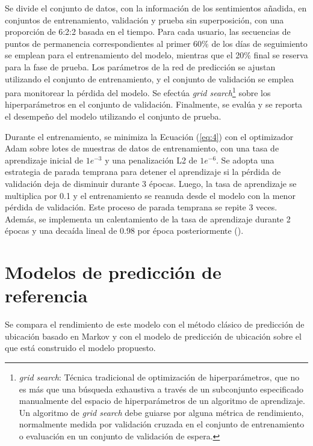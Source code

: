 Se divide el conjunto de datos, con la información de los sentimientos
a\~nadida, en conjuntos de
entrenamiento, validaci\'on y prueba sin superposici\'on, con una 
proporci\'on de 6:2:2 basada en el tiempo. Para cada usuario, 
las secuencias de puntos de permanencia correspondientes al 
primer 60\% de los días de seguimiento se emplean para el 
entrenamiento del modelo, mientras que el 20\% final se 
reserva para la fase de prueba. Los parámetros de la red 
de predicción se ajustan utilizando el conjunto de 
entrenamiento, y el conjunto de validación se emplea para 
monitorear la pérdida del modelo. 
Se efect\'ua \textit{grid search}\footnote{\textit{grid search}: 
T\'ecnica tradicional de optimización de 
hiperparámetros, que no es más que una búsqueda exhaustiva a través de 
un subconjunto especificado manualmente del espacio de hiperparámetros 
de un algoritmo de aprendizaje. Un algoritmo de \textit{grid search} debe 
guiarse por alguna métrica de rendimiento, normalmente medida por validación 
cruzada en el conjunto de entrenamiento o evaluación en un conjunto de validación de espera.}
sobre los hiperpar\'ametros en el conjunto de validaci\'on. Finalmente, 
se eval\'ua y se reporta el 
desempe\~no del modelo utilizando el conjunto de prueba.

Durante el entrenamiento, se minimiza la Ecuaci\'on (\ref{eq:4}) con el optimizador 
Adam sobre lotes de muestras de datos de entrenamiento, con una tasa de 
aprendizaje inicial de $1e^{-3}$ y una penalizaci\'on L2 de $1e^{-6}$. 
Se adopta una estrategia de parada temprana para detener el aprendizaje si 
la p\'erdida de validaci\'on deja de disminuir durante 3 \'epocas. Luego, 
la tasa de aprendizaje se multiplica por 0.1 y el entrenamiento se 
reanuda desde el modelo con la menor p\'erdida de validaci\'on. Este proceso 
de parada temprana se repite 3 veces. Adem\'as, se implementa un 
calentamiento de la tasa de aprendizaje durante 2 \'epocas y una deca\'ida 
lineal de 0.98 por \'epoca posteriormente (\cite{vaswani2017attention}).

\section{Modelos de predicci\'on de referencia}

Se compara el rendimiento de este modelo con el m\'etodo 
clásico de predicci\'on de ubicaci\'on basado en Markov y con el modelo 
de predicci\'on de ubicaci\'on sobre el que est\'a construido 
el modelo propuesto.

